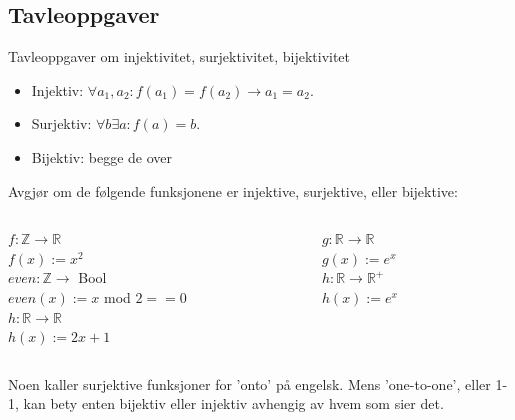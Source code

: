 \subsection{Tavleoppgaver}
\begin{frame}{Tavleoppgaver om injektivitet, surjektivitet, bijektivitet}
    \begin{itemize}
        \item Injektiv:  $\forall a_1, a_2 : f(a_1) = f(a_2) \rightarrow a_1 = a_2$.\\
        \item Surjektiv: $\forall b \exists a : f(a) = b$.\\
        \item Bijektiv: begge de over \\
    \end{itemize}
    \pause
    \begin{block}{Avgjør om de følgende funksjonene er injektive, surjektive, eller bijektive:}
        \begin{columns}
            \begin{column}{0.45\textwidth}
                $f : \mathbb{Z} \rightarrow \mathbb{R}$\\
                $f(x) := x^2$\\[1mm]
                \pause
                $even : \mathbb{Z} \rightarrow $ Bool\\
                $even(x) := x$ mod $2 == 0$\\[1mm]
                \pause
                $h : \mathbb{R} \rightarrow \mathbb{R}$\\
                $h(x) := 2x + 1$\\[1mm]
            \end{column}
            \pause
            \begin{column}{0.45\textwidth}
                $g : \mathbb{R} \rightarrow \mathbb{R}$\\
                $g(x) := e^x$\\[1mm]
                \pause
                $h : \mathbb{R} \rightarrow \mathbb{R}^+$\\
                $h(x) := e^x$
            \end{column}
        \end{columns}
    \end{block}
    \pause
    Noen kaller surjektive funksjoner for 'onto' på engelsk. Mens 'one-to-one', eller 1-1, kan bety enten bijektiv eller injektiv avhengig av hvem som sier det.
\end{frame}